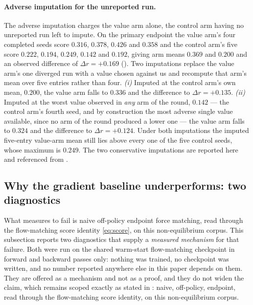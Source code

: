 \paragraph{Adverse imputation for the unreported run.}
\label{app:imputation}
The adverse imputation charges the value arm alone, the control arm having no
unreported run left to impute. On the primary endpoint the value arm's four completed
seeds score $0.316$, $0.378$, $0.426$ and $0.358$ and the control arm's five score
$0.222$, $0.194$, $0.249$, $0.142$ and $0.192$, giving arm means $0.369$ and $0.200$
and an observed difference of $\Delta r = +0.169$ (). Two
imputations replace the value arm's one diverged run with a value chosen against us
and recompute that arm's mean over five entries rather than four. \emph{(i)} Imputed at
the control arm's own mean, $0.200$, the value arm falls to $0.336$ and the difference
to $\Delta r = +0.135$. \emph{(ii)} Imputed at the worst value observed in \emph{any}
arm of the round, $0.142$ --- the control arm's fourth seed, and by construction the
most adverse single value available, since no arm of the round produced a lower one ---
the value arm falls to $0.324$ and the difference to $\Delta r = +0.124$. Under both
imputations the imputed five-entry value-arm mean still lies above every one of the
five control seeds, whose maximum is $0.249$. The two conservative imputations are
reported here and referenced from .

\subsection{Why the gradient baseline underperforms: two diagnostics}
\label{app:forcemech}

What  measures to fail is naive off-policy endpoint force matching,
read through the flow-matching score identity \eqref{eq:score}, on this non-equilibrium
corpus. This subsection reports two diagnostics that supply a \emph{measured mechanism}
for that failure. Both were run on the shared warm-start flow-matching checkpoint in
forward and backward passes only: nothing was trained, no checkpoint was written, and no
number reported anywhere else in this paper depends on them. They are offered as a
mechanism and not as a proof, and they do not widen the claim, which remains scoped
exactly as stated in : naive, off-policy, endpoint, read through
the flow-matching score identity, on this non-equilibrium corpus.

